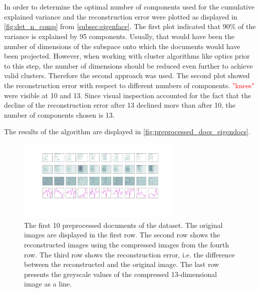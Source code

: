 \section{\eigendocs{}}\label{sec:evaluation-eigendocs}
In order to determine the optimal number of components used for \eigendocs{} the cumulative explained variance and the reconstruction error were plotted 
as displayed in \autoref{fig:det_n_comp} from \autoref{subsec:eigenface}.
The first plot indicated that 90\% of the variance is explained by 95 components.
Usually, that would have been the number of dimensions of the subspace onto which the documents would have been projected.
However, when working with cluster algorithms like \ac{optics} prior to this step, the number of dimensions should be reduced even further to achieve valid clusters.
Therefore the second approach was used.
The second plot showed the reconstruction error with respect to different numbers of components.
\textcolor{red}{"knees"} were visible at 10 and 13.
Since visual inspection accounted for the fact that the decline of the reconstruction error after 13 declined more than after 10, the number of components chosen is 13.

The results of the \eigendocs{} algorithm are displayed in \autoref{fig:preprocessed_docs_eigendocs}.

\begin{figure}[htp] %
    \centering
    \includegraphics[width=0.7\textwidth]{images/Eigendocs/transformation/eigendocs_13dims.pdf}
    \caption{The first 10 preprocessed documents of the dataset.
    The original images are displayed in the first row.
    The second row shows the reconstructed images using the compressed images from the fourth row.
    The third row shows the reconstruction error, i.e. the difference between the reconstructed and the original image.
    The last row presents the greyscale values of the compressed 13-dimensional image as a line.
    }
    \label{fig:preprocessed_docs_eigendocs}
\end{figure}